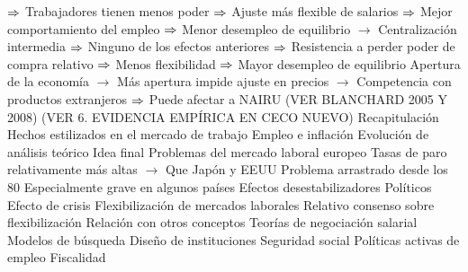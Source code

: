 \documentclass{nuevotema}
\begin{document}
\begin{esquemal}
				\4[] $\Rightarrow$ Trabajadores tienen menos poder
				\4[] $\Rightarrow$ Ajuste más flexible de salarios
				\4[] $\Rightarrow$ Mejor comportamiento del empleo
				\4[] $\Rightarrow$ Menor desempleo de equilibrio
				\4[] $\to$ Centralización intermedia
				\4[] $\Rightarrow$ Ninguno de los efectos anteriores
				\4[] $\Rightarrow$ Resistencia a perder poder de compra relativo
				\4[] $\Rightarrow$ Menos flexibilidad
				\4[] $\Rightarrow$ Mayor desempleo de equilibrio
				\4[] Apertura de la economía
				\4[] $\to$ Más apertura impide ajuste en precios
				\4[] $\to$ Competencia con productos extranjeros
				\4[] $\Rightarrow$ Puede afectar a NAIRU
				\4[] (VER BLANCHARD 2005 Y 2008)
				\4[] (VER 6. EVIDENCIA EMPÍRICA EN CECO NUEVO)
	\1[] 
		\2 Recapitulación
			\3 Hechos estilizados en el mercado de trabajo
			\3 Empleo e inflación
			\3 Evolución de análisis teórico
		\2 Idea final
			\3 Problemas del mercado laboral europeo
				\4 Tasas de paro relativamente más altas
				\4[] $\to$ Que Japón y EEUU
				\4 Problema arrastrado desde los 80
				\4 Especialmente grave en algunos países
				\4 Efectos desestabilizadores
				\4[] Políticos
				\4[] Efecto de crisis
			\3 Flexibilización de mercados laborales
				\4 Relativo consenso sobre flexibilización
				\4[]
			\3 Relación con otros conceptos
				\4 Teorías de negociación salarial
				\4 Modelos de búsqueda
				\4 Diseño de instituciones
				\4[] Seguridad social
				\4[] Políticas activas de empleo
				\4[] Fiscalidad
\end{esquemal}

\graficas
\end{document}
